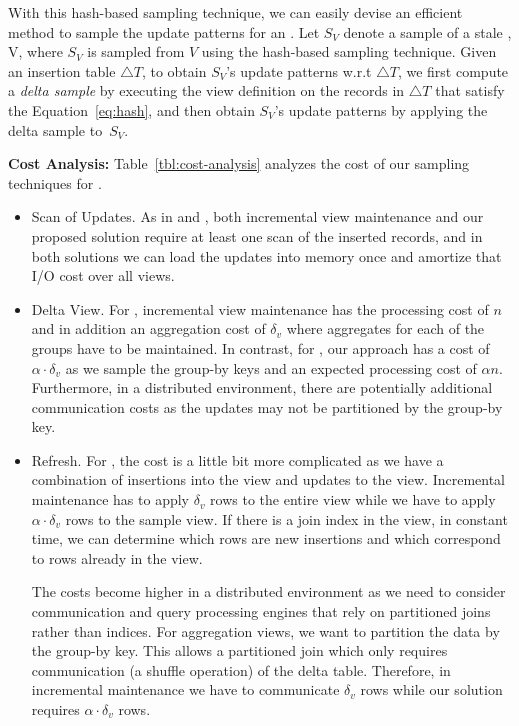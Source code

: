 With this hash-based sampling technique, we can easily devise an efficient method to sample the update patterns for an \aggview. Let $S_{V}$ denote a sample of a stale \aggview, V, where $S_{V}$ is sampled from $V$ using the hash-based sampling technique. Given an insertion table $\triangle T$, to obtain $S_{V}$'s update patterns w.r.t $\triangle T$, we first compute a \emph{delta sample \aggview} by executing the view definition on the records in $\triangle T$ that satisfy the Equation~\ref{eq:hash}, and then obtain $S_{V}$'s update patterns by applying the delta sample \aggview to~$S_{V}$. 

\vspace{.5em}
{\noindent \bf Cost Analysis: }
 Table~\ref{tbl:cost-analysis} analyzes the cost of our sampling techniques for \aggview.
\vspace{-0.5em}
\begin{itemize}
\item Scan of Updates.
As in \spview and \fjview, both incremental view maintenance and our proposed solution require at least one scan of the inserted records, and in both solutions we can load the updates into memory once and amortize that I/O cost over all views. \vspace{-0.5em}
\item Delta View. For \aggview, incremental view maintenance has the processing cost of $n$ and in addition an aggregation cost of $\delta_v$ where aggregates for each of the groups have to be maintained. In contrast, for \aggview, our approach has a cost of $\alpha \cdot \delta_v$ as we sample the group-by keys and an expected processing cost of $\alpha n$.  
Furthermore, in a distributed environment, there are potentially additional communication costs as the updates may not be partitioned by the group-by key. \vspace{-0.5em}
\item Refresh. For \aggview, the cost is a little bit more complicated as we have a combination of insertions into the view and updates to the view. 
Incremental maintenance has to apply $\delta_v$ rows to the entire view while we have to apply $\alpha \cdot \delta_v$ rows to the sample view. 
If there is a join index in the view, in constant time, we can determine which rows are new insertions and which correspond to rows already in the view.

\vspace{-0.25em}

The costs become higher in a distributed environment as we need to consider communication and query processing engines that rely on partitioned joins rather than indices.
For aggregation views, we want to partition the data by the group-by key.
This allows a partitioned join which only requires communication (a shuffle operation) of the delta table.
Therefore, in incremental maintenance we have to communicate $\delta_v$ rows while our solution requires $\alpha \cdot \delta_v$ rows.  
\end{itemize}

